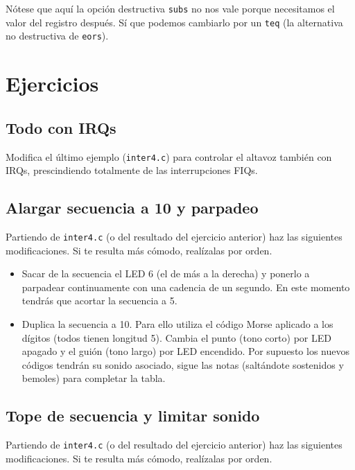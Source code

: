 Nótese que aquí la opción destructiva {\tt subs} no nos vale porque necesitamos el valor del
registro después. Sí que podemos cambiarlo por un {\tt teq} (la alternativa no destructiva
de {\tt eors}).

\section{Ejercicios}

\subsection{Todo con IRQs}

Modifica el último ejemplo ({\tt inter4.c}) para controlar el altavoz también con IRQs,
prescindiendo totalmente de las interrupciones FIQs.

\subsection{Alargar secuencia a 10 y parpadeo}

Partiendo de {\tt inter4.c} (o del resultado del ejercicio anterior) haz las siguientes
modificaciones. Si te resulta más cómodo, realízalas por orden.

\begin{itemize}
  \item Sacar de la secuencia el LED 6 (el de más a la derecha) y ponerlo a parpadear
        continuamente con una cadencia de un segundo. En este momento tendrás que acortar
        la secuencia a 5.
  \item Duplica la secuencia a 10. Para ello utiliza el código Morse aplicado a los dígitos
        (todos tienen longitud 5). Cambia el punto (tono corto) por LED apagado y el guión
        (tono largo) por LED encendido. Por supuesto los nuevos códigos tendrán su sonido
        asociado, sigue las notas (saltándote sostenidos y bemoles) para completar la tabla.
\end{itemize}

\subsection{Tope de secuencia y limitar sonido}

Partiendo de {\tt inter4.c} (o del resultado del ejercicio anterior) haz las siguientes
modificaciones. Si te resulta más cómodo, realízalas por orden.

